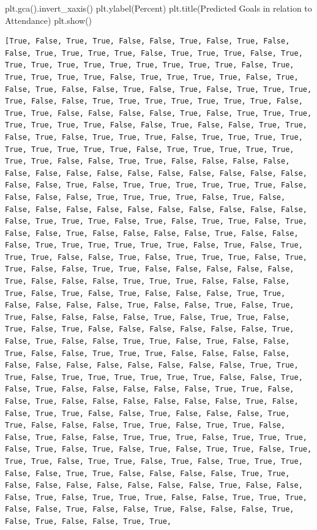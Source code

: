 \documentclass[
  letterpaper,
  DIV=11,
  numbers=noendperiod]{scrartcl}
\newenvironment{Shaded}{\begin{snugshade}}{\end{snugshade}}
\newcommand{\NormalTok}[1]{\textcolor[rgb]{0.00,0.23,0.31}{#1}}
\newcommand{\StringTok}[1]{\textcolor[rgb]{0.13,0.47,0.30}{#1}}
\begin{document}
\begin{Shaded}
\begin{Highlighting}[]
\NormalTok{plt.gca().invert\_xaxis()}
\NormalTok{plt.ylabel(}\StringTok{\textquotesingle{}Percent\textquotesingle{}}\NormalTok{)}
\NormalTok{plt.title(}\StringTok{\textquotesingle{}Predicted Goals in relation to Attendance\textquotesingle{}}\NormalTok{)}
\NormalTok{plt.show()}
\end{Highlighting}
\end{Shaded}

\begin{verbatim}
[True, False, True, True, False, False, True, False, True, False, False, True, True, True, True, False, True, True, True, False, True, True, True, True, True, True, True, True, True, True, False, True, True, True, True, True, False, True, True, True, True, False, True, False, True, False, False, True, False, True, False, True, True, True, True, False, False, True, True, True, True, True, True, True, False, True, True, False, False, False, False, True, False, True, True, True, True, True, True, True, False, False, True, False, False, True, True, False, True, False, True, True, True, False, True, True, True, True, True, True, True, True, True, False, True, True, True, True, True, True, True, False, False, True, True, False, False, False, False, False, False, False, False, False, False, False, False, False, False, False, False, True, False, True, True, True, True, True, True, False, False, False, False, True, True, True, True, False, True, False, False, False, False, False, False, False, False, False, False, False, False, True, True, True, False, True, False, True, True, False, True, False, False, True, False, False, False, False, True, False, False, False, True, True, True, True, True, True, False, True, False, True, True, True, False, False, True, False, True, True, True, False, True, True, False, False, True, True, False, False, False, False, False, True, False, False, False, True, True, True, False, False, False, True, False, True, False, True, False, False, False, True, True, False, False, False, False, True, False, False, True, False, True, True, False, False, False, False, True, False, True, True, False, True, False, True, False, False, False, False, False, False, True, False, True, False, False, True, True, False, True, False, False, True, False, False, True, True, True, False, False, False, False, False, False, False, False, False, False, False, False, True, True, True, False, True, True, True, True, True, True, False, False, True, False, True, False, False, False, False, False, True, True, False, False, True, False, False, False, False, False, False, True, False, False, True, True, False, False, True, False, False, False, True, True, False, False, False, True, True, False, True, True, False, False, True, False, False, True, True, True, False, True, True, True, False, True, False, True, False, True, False, True, True, False, True, True, True, False, True, True, False, True, False, True, True, True, False, False, True, True, False, False, False, False, True, True, False, False, False, False, False, False, False, True, False, False, False, True, False, True, True, True, False, False, True, True, True, False, False, True, False, False, True, False, False, False, True, False, True, False, False, True, True, 
\end{verbatim}
\end{document}
